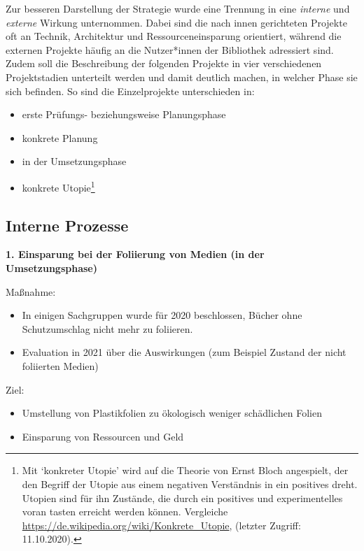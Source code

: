 \documentclass[a4paper,
fontsize=11pt,
oneside,
numbers=noperiodatend,
parskip=half-,
bibliography=totoc,
final
]{scrartcl}
\begin{document}
Zur besseren Darstellung der Strategie wurde eine Trennung in eine
\emph{interne} und \emph{externe} Wirkung unternommen. Dabei sind die
nach innen gerichteten Projekte oft an Technik, Architektur und
Ressourceneinsparung orientiert, während die externen Projekte häufig an
die Nutzer*innen der Bibliothek adressiert sind. Zudem soll die
Beschreibung der folgenden Projekte in vier verschiedenen Projektstadien
unterteilt werden und damit deutlich machen, in welcher Phase sie sich
befinden. So sind die Einzelprojekte unterschieden in:

\begin{itemize}[itemsep=-5pt]
\item erste Prüfungs- beziehungsweise Planungsphase
\item konkrete Planung
\item in der Umsetzungsphase
\item konkrete Utopie\footnote{Mit \enquote*{konkreter Utopie} wird auf die
    Theorie von Ernst Bloch angespielt, der den Begriff der Utopie aus
    einem negativen Verständnis in ein positives dreht. Utopien sind für
    ihn Zustände, die durch ein positives und experimentelles voran
    tasten erreicht werden können. Vergleiche
    \url{https://de.wikipedia.org/wiki/Konkrete_Utopie}, (letzter
    Zugriff: 11.10.2020).}
\end{itemize}

\hypertarget{interne-prozesse}{%
\subsection{Interne Prozesse}\label{interne-prozesse}}

\textbf{1. Einsparung bei der Foliierung von Medien (in der
Umsetzungsphase)}

Maßnahme:

\begin{itemize}[itemsep=-5pt]

\item
  In einigen Sachgruppen wurde für 2020 beschlossen, Bücher ohne
  Schutzumschlag nicht mehr zu foliieren.
\item
  Evaluation in 2021 über die Auswirkungen (zum Beispiel Zustand der
  nicht foliierten Medien)
\end{itemize}

Ziel:

\begin{itemize}[itemsep=-5pt]

\item
  Umstellung von Plastikfolien zu ökologisch weniger schädlichen Folien
\item
  Einsparung von Ressourcen und Geld
\end{itemize}
\end{document}
